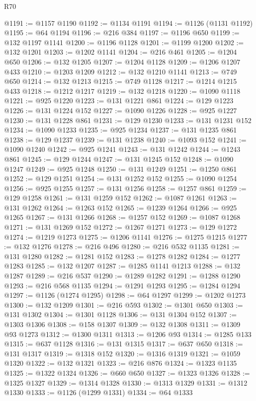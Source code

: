 \begin{lexlean}{R70}
\begin{coremodule}
@1191 := @1157 @1190
@1192 := @1134 @1191
@1194 := @1126 (@1131 @1192)
@1195 := @64 @1194
@1196 := @216 @384
@1197 := @1196 @650
@1199 := @132 @1197 @1141
@1200 := @1196 @1128
@1201 := @1199 @1200
@1202 := @132 @1201
@1203 := @1202 @1141
@1204 := @216 @461
@1205 := @1204 @650
@1206 := @132 @1205
@1207 := @1204 @1128
@1209 := @1206 @1207 @433
@1210 := @1203 @1209
@1212 := @132 @1210 @1141
@1213 := @749 @650
@1214 := @132 @1213
@1215 := @749 @1128
@1217 := @1214 @1215 @433
@1218 := @1212 @1217
@1219 := @132 @1218
@1220 := @1090 @1118
@1221 := @925 @1220
@1223 := @131 @1221 @861
@1224 := @129 @1223
@1226 := @131 @1224 @152
@1227 := @1090 @1226
@1228 := @925 @1227
@1230 := @131 @1228 @861
@1231 := @129 @1230
@1233 := @131 @1231 @152
@1234 := @1090 @1233
@1235 := @925 @1234
@1237 := @131 @1235 @861
@1238 := @129 @1237
@1239 := @131 @1238
@1240 := @1093 @152
@1241 := @1090 @1240
@1242 := @925 @1241
@1243 := @131 @1242
@1244 := @1243 @861
@1245 := @129 @1244
@1247 := @131 @1245 @152
@1248 := @1090 @1247
@1249 := @925 @1248
@1250 := @131 @1249
@1251 := @1250 @861
@1252 := @129 @1251
@1254 := @131 @1252 @152
@1255 := @1090 @1254
@1256 := @925 @1255
@1257 := @131 @1256
@1258 := @1257 @861
@1259 := @129 @1258
@1261 := @131 @1259 @152
@1262 := @1087 @1261
@1263 := @131 @1262
@1264 := @1263 @152
@1265 := @1239 @1264
@1266 := @925 @1265
@1267 := @131 @1266
@1268 := @1257 @152
@1269 := @1087 @1268
@1271 := @131 @1269 @152
@1272 := @1267 @1271
@1273 := @129 @1272
@1274 := @1219 @1273
@1275 := @1206 @1141
@1276 := @1275 @1215
@1277 := @132 @1276
@1278 := @216 @496
@1280 := @216 @532 @1135
@1281 := @131 @1280
@1282 := @1281 @152
@1283 := @1278 @1282
@1284 := @1277 @1283
@1285 := @132 @1207
@1287 := @1285 @1141 @1213
@1288 := @132 @1287
@1289 := @216 @537
@1290 := @1289 @1282
@1291 := @1288 @1290
@1293 := @216 @568 @1135
@1294 := @1291 @1293
@1295 := @1284 @1294
@1297 := @1126 (@1274 @1295)
@1298 := @64 @1297
@1299 := @1202 @1273
@1300 := @132 @1209
@1301 := @216 @593
@1302 := @1301 @650
@1303 := @131 @1302
@1304 := @1301 @1128
@1306 := @131 @1304 @152
@1307 := @1303 @1306
@1308 := @158 @1307
@1309 := @132 @1308
@1311 := @1309 @93 @1273
@1312 := @1300 @1311
@1313 := @1206 @93
@1314 := @1285 @133
@1315 := @637 @1128
@1316 := @131 @1315
@1317 := @637 @650
@1318 := @131 @1317
@1319 := @1318 @152
@1320 := @1316 @1319
@1321 := @1059 @1320
@1322 := @132 @1321
@1323 := @216 @876
@1324 := @1323 @1135
@1325 := @1322 @1324
@1326 := @660 @650
@1327 := @1323 @1326
@1328 := @1325 @1327
@1329 := @1314 @1328
@1330 := @1313 @1329
@1331 := @1312 @1330
@1333 := @1126 (@1299 @1331)
@1334 := @64 @1333

\end{coremodule}
\end{lexlean}
